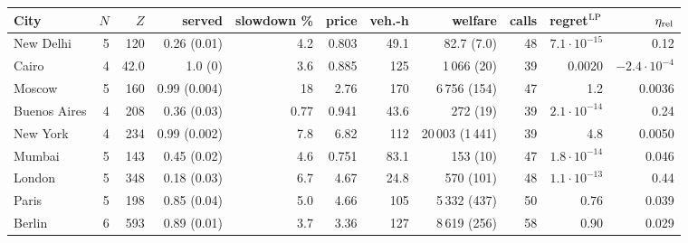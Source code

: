 \begin{tabular}{lrrrrrrrrrr}
\toprule
City & $N$ & $Z$ & served & slowdown \% & price & veh.-h & welfare & calls & regret$^{\rm LP}$ & $\eta_{\rm rel}$ \\
\midrule
New Delhi & 5 & 120 & 0.26 (0.01) & 4.2 & 0.803 & 49.1 & 82.7 (7.0) & 48 & $7.1\cdot10^{-15}$ & 0.12 \\
Cairo & 4 & 42.0 & 1.0 (0) & 3.6 & 0.885 & 125 & 1\,066 (20) & 39 & 0.0020 & $-2.4\cdot10^{-4}$ \\
Moscow & 5 & 160 & 0.99 (0.004) & 18 & 2.76 & 170 & 6\,756 (154) & 47 & 1.2 & 0.0036 \\
Buenos Aires & 4 & 208 & 0.36 (0.03) & 0.77 & 0.941 & 43.6 & 272 (19) & 39 & $2.1\cdot10^{-14}$ & 0.24 \\
New York & 4 & 234 & 0.99 (0.002) & 7.8 & 6.82 & 112 & 20\,003 (1\,441) & 39 & 4.8 & 0.0050 \\
Mumbai & 5 & 143 & 0.45 (0.02) & 4.6 & 0.751 & 83.1 & 153 (10) & 47 & $1.8\cdot10^{-14}$ & 0.046 \\
London & 5 & 348 & 0.18 (0.03) & 6.7 & 4.67 & 24.8 & 570 (101) & 48 & $1.1\cdot10^{-13}$ & 0.44 \\
Paris & 5 & 198 & 0.85 (0.04) & 5.0 & 4.66 & 105 & 5\,332 (437) & 50 & 0.76 & 0.039 \\
Berlin & 6 & 593 & 0.89 (0.01) & 3.7 & 3.36 & 127 & 8\,619 (256) & 58 & 0.90 & 0.029 \\
\bottomrule
\end{tabular}
